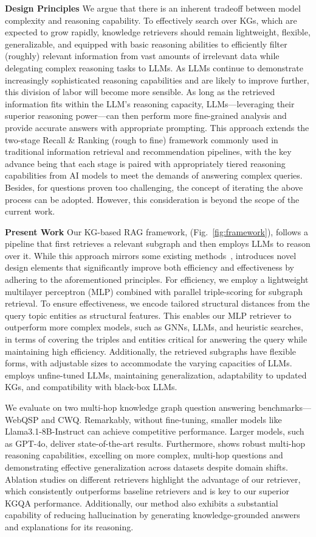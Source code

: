 \textbf{Design Principles} We argue that there is an inherent tradeoff between model complexity and reasoning capability. To effectively search over KGs, which are expected to grow rapidly, knowledge retrievers should remain lightweight, flexible, generalizable, and equipped with basic reasoning abilities to efficiently filter (roughly) relevant information from vast amounts of irrelevant data while delegating complex reasoning tasks to LLMs. As LLMs continue to demonstrate increasingly sophisticated reasoning capabilities and are likely to improve further, this division of labor will become more sensible. As long as the retrieved 
information fits within the LLM's reasoning capacity, LLMs—leveraging their superior reasoning power—can then perform more fine-grained analysis and provide accurate answers with appropriate prompting. This approach extends the two-stage Recall \& Ranking (rough to fine) framework commonly used in traditional information retrieval and recommendation pipelines, with the key advance being that each stage is paired with appropriately tiered reasoning capabilities from AI models to meet the demands of answering complex queries. Besides, for questions proven too challenging, the concept of iterating the above process can be adopted. However, this consideration is beyond the scope of the current work.

\textbf{Present Work} Our KG-based RAG framework, \proj (Fig.~\ref{fig:framework}), follows a pipeline that first retrieves a relevant subgraph and then employs LLMs to reason over it. While this approach mirrors some existing methods~\citep{he2021improving, jiang2023unikgqa}, \proj introduces novel design elements that significantly improve both efficiency and effectiveness by adhering to the aforementioned principles. 
For efficiency, we employ a lightweight multilayer perceptron (MLP) combined with parallel triple-scoring for subgraph retrieval. To ensure effectiveness, we encode tailored structural distances from the query topic entities as structural features. This enables our MLP retriever to outperform more complex models, such as GNNs, LLMs, and heuristic searches, in terms of covering the triples and entities critical for answering the query while maintaining high efficiency. Additionally, the retrieved subgraphs have flexible forms, with adjustable sizes to accommodate the varying capacities of LLMs. \proj employs unfine-tuned LLMs, maintaining generalization, adaptability to updated KGs, and compatibility with black-box LLMs.

We evaluate \proj on two multi-hop knowledge graph question answering benchmarks—WebQSP and CWQ. Remarkably, without fine-tuning, smaller models like Llama3.1-8B-Instruct can achieve competitive performance. Larger models, such as GPT-4o, deliver state-of-the-art results. Furthermore, \proj shows robust multi-hop reasoning capabilities, excelling on more complex, multi-hop questions and demonstrating effective generalization across datasets despite domain shifts. Ablation studies on different retrievers highlight the advantage of our retriever, which consistently outperforms baseline retrievers and is key to our superior KGQA performance. Additionally, our method also exhibits a substantial capability of reducing hallucination by generating knowledge-grounded answers and explanations for its reasoning.
